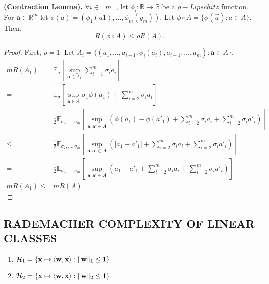 \begin{lemma}
    \textbf{(Contraction Lemma).}
    $ \forall i \in [m] $, let $ \phi_i: \mathbb{R} \rightarrow \mathbb{R} $ be a $ \rho-Lipschitz $ function.
    For $ \mathbf{a} \in \mathbb{R}^m $ let $ \phi(a) = (\phi_1(a1), \ldots, \phi_m(y_m)) $.
    Let $ \phi \circ A = \{ \phi(\vec a) : a \in A \} $. Then,
    \[
        R(\phi \circ A) \le \rho R(A).
    \]
    \begin{proof}
        First, $ \rho = 1 $.
        Let $ A_i = \{ (a_1, \ldots, a_{i-1}, \phi_i(a_i), a_{i+1}, \ldots, a_m) : \mathbf{a} \in A \} $.
        \begin{align*}
            mR(A_1) =& \mathbb{E}_{\sigma} \left[ \sup_{\mathbf{a} \in A_1} \sum^{m}_{i=1} \sigma_i a_i \right]\\
            =& \mathbb{E}_{\sigma} \left[ \sup_{\mathbf{a} \in A} \sigma_1 \phi(a_1) + \sum^{m}_{i=2} \sigma_i a_i \right]\\
            =& \frac{1}{2} \mathbb{E}_{\sigma_2, \ldots, \sigma_m}
            \left[ \sup_{\mathbf{a,a'} \in A} \left( \phi(a_1) - \phi(a'_1) + \sum^{m}_{i=2} \sigma_i a_i + \sum^{m}_{i=2} \sigma_i a'_i \right) \right] \\
            \le& \frac{1}{2} \mathbb{E}_{\sigma_2, \ldots, \sigma_m}
            \left[ \sup_{\mathbf{a,a'} \in A} \left( | a_1 - a'_1 | + \sum^{m}_{i=2} \sigma_i a_i + \sum^{m}_{i=2} \sigma_i a'_i \right) \right] \\
            =& \frac{1}{2} \mathbb{E}_{\sigma_2, \ldots, \sigma_m}
            \left[ \sup_{\mathbf{a,a'} \in A} \left( a_1 - a'_1 + \sum^{m}_{i=2} \sigma_i a_i + \sum^{m}_{i=2} \sigma_i a'_i \right) \right] \\
            mR(A_1) \le& mR(A)
        \end{align*}
    \end{proof}
\end{lemma}

\subsection{RADEMACHER COMPLEXITY OF LINEAR CLASSES}%
\label{sub:rademacher_complexity_of_linear_classes}
\begin{enumerate}
    \item $ \mathcal{H}_1 = \{ \mathbf{x} \mapsto \langle \mathbf{w}, \mathbf{x} \rangle : \Arrowvert \mathbf{w} \Arrowvert_1 \le 1 \} $ 
    \item $ \mathcal{H}_2 = \{ \mathbf{x} \mapsto \langle \mathbf{w}, \mathbf{x} \rangle : \Arrowvert \mathbf{w} \Arrowvert_2 \le 1 \} $ 
\end{enumerate}

